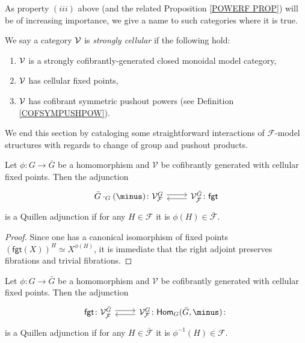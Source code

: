 \documentclass[a4paper,10pt]{article}%
\begin{document}
  As property $(iii)$ above (and the related Proposition \ref{POWERF PROP}) will be of increasing importance, we  give a name to such categories where it is true.
\begin{definition}
  \label{STRONGLY_CELLULAR}
  We say a category $\mathcal V$ is \textit{strongly cellular} if the following hold: 
  \begin{enumerate} 
  \item $\mathcal V$ is a strongly cofibrantly-generated closed monoidal model category,
  \item $\mathcal V$ has cellular fixed points,
  \item $\mathcal V$ has cofibrant symmetric pushout powers (see Definition \ref{COFSYMPUSHPOW}).
  \end{enumerate} 
\end{definition} 


We end this section by cataloging some straightforward interactions of $\mathcal{F}$-model structures
with regards to change of group and pushout products.


\begin{proposition}\label{FGTRIGHT PROP}
	Let $\phi \colon G \to \bar{G}$ be a homomorphism and $\mathcal{V}$ be cofibrantly generated with cellular fixed points.	
	Then the adjunction
\begin{equation}
\begin{tikzcd}
	\bar{G}\cdot_G(\minus)
	\colon
	\mathcal{V}^{G}_{\mathcal{F}} \ar[shift left=1]{r}
&
	\mathcal{V}^{\bar{G}}_{\bar{\mathcal{F}}}
	\colon \ar[shift left=1]{l}
	\mathsf{fgt}
\end{tikzcd}
\end{equation}
is a Quillen adjunction if for any 
$H \in \mathcal{F}$ it is $\phi(H) \in \bar{\mathcal{F}}$.
\end{proposition}

\begin{proof}
Since one has a canonical isomorphism of fixed points
$\left(\mathsf{fgt}(X)\right)^H \simeq X^{\phi(H)}$,
it is immediate that the right adjoint preserves fibrations and trivial fibrations.
\end{proof}


\begin{proposition}\label{FGTLEFT PROP}
	Let $\phi \colon G \to \bar{G}$ be a homomorphism and $\mathcal{V}$ be cofibrantly generated with cellular fixed points.		
	Then the adjunction
\begin{equation}
\begin{tikzcd}
	\mathsf{fgt}
	\colon
	\mathcal{V}^{\bar{G}}_{\mathcal{\bar{F}}} \ar[shift left=1]{r}
&
	\mathcal{V}^{G}_{\mathcal{F}}
	\colon
	\mathsf{Hom}_G(\bar{G},\minus)
	\colon \ar[shift left=1]{l}
\end{tikzcd}
\end{equation}
is a Quillen adjunction if for any 
$H \in \bar{\mathcal{F}}$ it is 
$\phi^{-1}(H) \in \mathcal{F}$.
\end{proposition}
\end{document}
